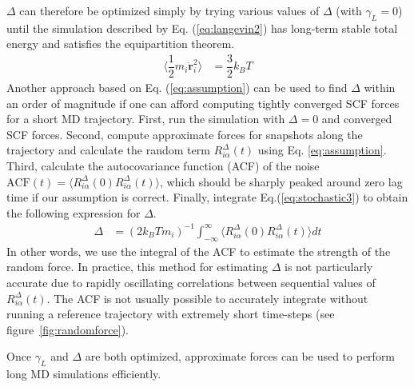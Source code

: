 \documentclass[10pt,aps,prl,twocolumn,amsmath,amssymb,superscriptaddress,longbibliography]{revtex4-1}
\begin{document}
$\Delta$ can therefore be optimized simply by trying various values of $\Delta$ (with \mbox{$\gamma_L = 0$}) until the simulation described by Eq. (\ref{eq:langevin2}) has long-term stable total energy and satisfies the equipartition theorem. 
%
\begin{align}
\label{eq:eqipartition}
\langle \dfrac{1}{2} m_i \dot{\bm{r}}^{2}_{i} \rangle &= \dfrac{3}{2} k_{B} T
\end{align}
%
Another approach based on Eq. (\ref{eq:assumption}) can be used to find $\Delta$ within an order of magnitude if one can afford computing tightly converged SCF forces for a short MD trajectory. 
First, run the simulation with $\Delta = 0$ and converged SCF forces. 
Second, compute approximate forces for snapshots along the trajectory and calculate the random term $R^{\Delta}_{i\alpha} (t)$ using Eq. \ref{eq:assumption}. 
Third, calculate the autocovariance function (ACF) of the noise $\text{ACF}(t) = \langle R^{\Delta}_{i\alpha} (0)  R^{\Delta}_{i\alpha} (t) \rangle$, which should be sharply peaked around zero lag time if our assumption is correct. 
Finally, integrate Eq.(\ref{eq:stochastic3}) to obtain the following expression for $\Delta$.
%
\begin{align}
\label{eq:delta}
\Delta &= (2 k_B T m_i )^{-1} \int_{-\infty}^{\infty}\langle R^{\Delta}_{i\alpha} (0)  R^{\Delta}_{i\alpha} (t) \rangle dt
\end{align}
%
In other words, we use the integral of the ACF to estimate the strength of the random force. 
In practice, this method for estimating $\Delta$ is not particularly accurate due to rapidly oscillating correlations between sequential values of $R^{\Delta}_{i\alpha} (t)$. The ACF is not usually possible to accurately integrate without running a reference trajectory with extremely short time-steps (see figure~\ref{fig:randomforce}).

Once $\gamma_L$ and $\Delta$ are both optimized, approximate forces can be used to perform long MD simulations efficiently.
\bigskip
\end{document}
